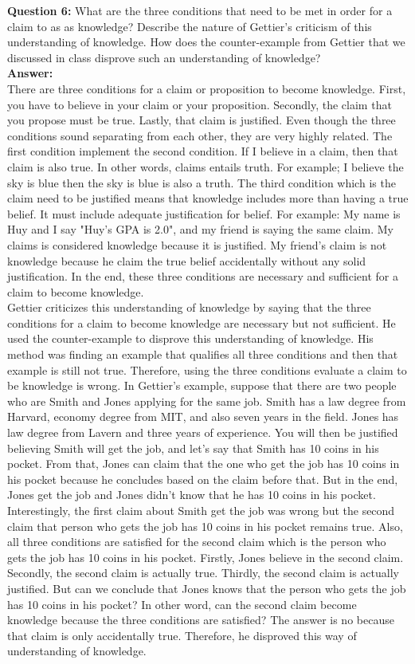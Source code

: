 \documentclass{article}
\begin{document}
\textbf{Question 6:} What are the three conditions that need to be met in order for a claim to as as knowledge? Describe the nature of Gettier's criticism of this understanding of knowledge. How does the counter-example from Gettier that we discussed in class disprove such an understanding of knowledge?\\
\indent \textbf{Answer: }\\
\indent There are three conditions for a claim or proposition to become knowledge. First, you have to believe in your claim or your proposition. Secondly, the claim that you propose must be true. Lastly, that claim is justified. Even though the three conditions sound separating from each other, they are very highly related. The first condition implement the second condition. If I believe in a claim, then that claim is also true. In other words, claims entails truth. For example; I believe the sky is blue then the sky is blue is also a truth. The third condition which is the claim need to be justified means that knowledge includes more than having a true belief. It must include adequate justification for belief. For example: My name is Huy and I say "Huy's GPA is 2.0", and my friend is saying the same claim. My claims is considered knowledge because it is justified. My friend's claim is not knowledge because he claim the true belief accidentally without any solid justification. In the end, these three conditions are necessary and sufficient for a claim to become knowledge.\\
\indent Gettier criticizes this understanding of knowledge by saying that the three conditions for a claim to become knowledge are necessary but not sufficient. He used the counter-example to disprove this understanding of knowledge. His method was finding an example that qualifies all three conditions and then that example is still not true. Therefore, using the three conditions evaluate a claim to be knowledge is wrong. In Gettier's example, suppose that there are two people who are Smith and Jones applying for the same job. Smith has a law degree from Harvard, economy degree from MIT, and also seven years in the field. Jones has law degree from Lavern and three years of experience. You will then be justified believing Smith will get the job, and let's say that Smith has 10 coins in his pocket. From that, Jones can claim that the one who get the job has 10 coins in his pocket because he concludes based on the claim before that. But in the end, Jones get the job and Jones didn't know that he has 10 coins in his pocket. Interestingly, the first claim about Smith get the job was wrong but the second claim that person who gets the job has 10 coins in his pocket remains true. Also, all three conditions are satisfied for the second claim which is the person who gets the job has 10 coins in his pocket. Firstly, Jones believe in the second claim. Secondly, the second claim is actually true. Thirdly, the second claim is actually justified. But can we conclude that Jones knows that the person who gets the job has 10 coins in his pocket? In other word, can the second claim become knowledge because the three conditions are satisfied? The answer is no because that claim is only accidentally true. Therefore, he disproved this way of understanding of knowledge.\\
\end{document}
